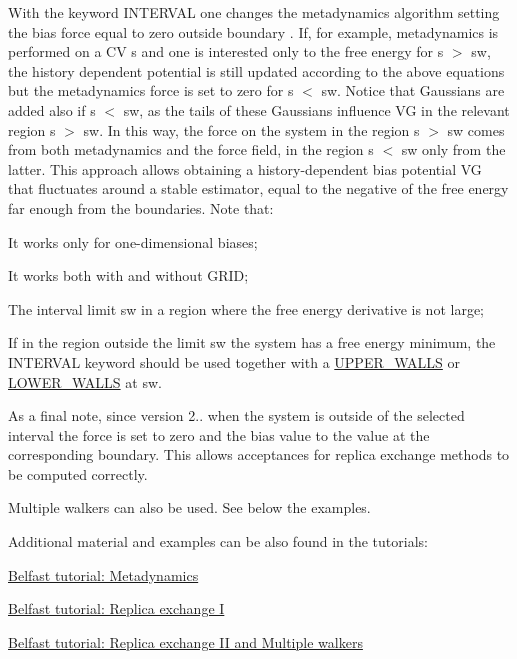 With the keyword I\+N\+T\+E\+R\+V\+A\+L one changes the metadynamics algorithm setting the bias force equal to zero outside boundary \cite{baftizadeh2012protein}. If, for example, metadynamics is performed on a C\+V s and one is interested only to the free energy for s $>$ sw, the history dependent potential is still updated according to the above equations but the metadynamics force is set to zero for s $<$ sw. Notice that Gaussians are added also if s $<$ sw, as the tails of these Gaussians influence V\+G in the relevant region s $>$ sw. In this way, the force on the system in the region s $>$ sw comes from both metadynamics and the force field, in the region s $<$ sw only from the latter. This approach allows obtaining a history-\/dependent bias potential V\+G that fluctuates around a stable estimator, equal to the negative of the free energy far enough from the boundaries. Note that\+:
\begin{DoxyItemize}
\item It works only for one-\/dimensional biases;
\item It works both with and without G\+R\+I\+D;
\item The interval limit sw in a region where the free energy derivative is not large;
\item If in the region outside the limit sw the system has a free energy minimum, the I\+N\+T\+E\+R\+V\+A\+L keyword should be used together with a \hyperlink{UPPER_WALLS}{U\+P\+P\+E\+R\+\_\+\+W\+A\+L\+L\+S} or \hyperlink{LOWER_WALLS}{L\+O\+W\+E\+R\+\_\+\+W\+A\+L\+L\+S} at sw.
\end{DoxyItemize}

As a final note, since version 2.. when the system is outside of the selected interval the force is set to zero and the bias value to the value at the corresponding boundary. This allows acceptances for replica exchange methods to be computed correctly.

Multiple walkers \cite{multiplewalkers} can also be used. See below the examples.

Additional material and examples can be also found in the tutorials\+:


\begin{DoxyItemize}
\item \hyperlink{belfast-6}{Belfast tutorial\+: Metadynamics}
\item \hyperlink{belfast-7}{Belfast tutorial\+: Replica exchange I}
\item \hyperlink{belfast-8}{Belfast tutorial\+: Replica exchange I\+I and Multiple walkers}
\end{DoxyItemize}

